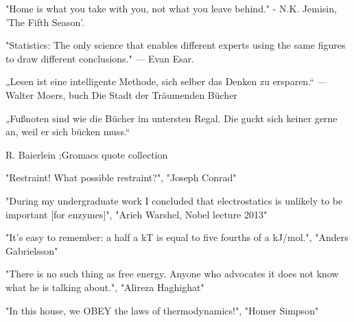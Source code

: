 
"Home is what you take with you, not what you leave behind."
- N.K. Jemisin, 'The Fifth Season'.


 "Statistics: The only science that enables different experts using the same figures to draw different conclusions."
— Evan Esar.




„Lesen ist eine intelligente Methode, sich selber das Denken zu ersparen.“ — Walter Moers, buch Die Stadt der Träumenden Bücher

„Fußnoten sind wie die Bücher im untersten Regal. Die guckt sich keiner gerne an, weil er sich bücken muss.“

{R. Baierlein ;Gromacs quote collection \cite{Abraham2015}}



"Restraint! What possible restraint?", "Joseph Conrad"

"During my undergraduate work I concluded that electrostatics is unlikely to be important [for enzymes]",
"Arieh Warshel, Nobel lecture 2013" 



"It's easy to remember: a half a kT is equal to five fourths of a kJ/mol.",
          "Anders Gabrielsson"
          
"There is no such thing as free energy. Anyone who advocates it does not know what he is talking about.",
          "Alireza Haghighat" 
              
"In this house, we OBEY the laws of thermodynamics!", "Homer Simpson"



